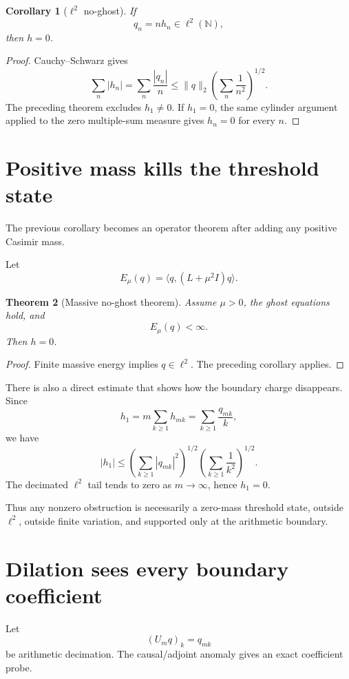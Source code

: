 \documentclass[11pt]{article}
\newtheorem{theorem}{Theorem}[section]
\newtheorem{corollary}[theorem]{Corollary}
\theoremstyle{definition}
\theoremstyle{remark}
\newcommand{\N}{\mathbb N}
\begin{document}
\begin{corollary}[\(\ell^2\) no-ghost]
If
\[
q_n=nh_n\in\ell^2(\N),
\]
then \(h=0\).
\end{corollary}

\begin{proof}
Cauchy--Schwarz gives
\[
\sum_n|h_n|
=
\sum_n\frac{|q_n|}{n}
\le
\|q\|_2
\left(\sum_n\frac1{n^2}\right)^{1/2}.
\]
The preceding theorem excludes \(h_1\ne0\).  If \(h_1=0\), the same cylinder argument applied to the zero multiple-sum measure gives \(h_n=0\) for every \(n\).
\end{proof}

\section{Positive mass kills the threshold state}

The previous corollary becomes an operator theorem after adding any positive Casimir mass.

Let
\[
E_\mu(q)
=
\langle q,(L+\mu^2I)q\rangle.
\]

\begin{theorem}[Massive no-ghost theorem]
Assume \(\mu>0\), the ghost equations hold, and
\[
E_\mu(q)<\infty.
\]
Then \(h=0\).
\end{theorem}

\begin{proof}
Finite massive energy implies \(q\in\ell^2\).  The preceding corollary applies.
\end{proof}

There is also a direct estimate that shows how the boundary charge disappears.  Since
\[
h_1
=
m\sum_{k\ge1}h_{mk}
=
\sum_{k\ge1}\frac{q_{mk}}{k},
\]
we have
\[
|h_1|
\le
\left(\sum_{k\ge1}|q_{mk}|^2\right)^{1/2}
\left(\sum_{k\ge1}\frac1{k^2}\right)^{1/2}.
\]
The decimated \(\ell^2\) tail tends to zero as \(m\to\infty\), hence \(h_1=0\).

Thus any nonzero obstruction is necessarily a zero-mass threshold state, outside \(\ell^2\), outside finite variation, and supported only at the arithmetic boundary.

\section{Dilation sees every boundary coefficient}

Let
\[
(U_mq)_k=q_{mk}
\]
be arithmetic decimation.  The causal/adjoint anomaly gives an exact coefficient probe.
\end{document}
